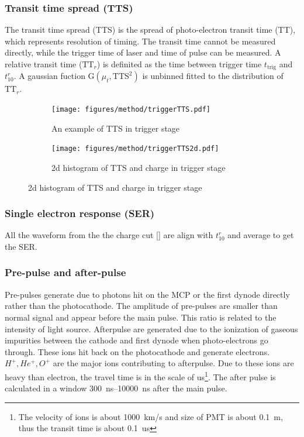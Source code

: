 \subsubsection{Transit time spread (TTS)}
The transit time spread (TTS) is the spread of photo-electron transit time (TT), which represents resolution of timing. The transit time cannot be measured directly, while the trigger time of laser and time of pulse can be measured. A relative transit time ($\mathrm{TT}_r$) is definited as the time between trigger time $t_{\mathrm{trig}}$ and $t_{10}^r$. A gaussian fuction G$(\mu_t,\mathrm{TTS}^2)$ is unbinned fitted to the distribution of $\mathrm{TT}_r$.
\begin{figure}[!htbp]
    \centering
    \begin{subfigure}[t]{0.47\textwidth}
        \texttt{[image: figures/method/triggerTTS.pdf]}
        \caption{An example of TTS in trigger stage}
        \label{fig:triggerTTS}
    \end{subfigure}
    \begin{subfigure}[t]{0.47\textwidth}
        \texttt{[image: figures/method/triggerTTS2d.pdf]}
        \caption{2d histogram of TTS and charge in trigger stage}
        \label{fig:triggerTTS2d}
    \end{subfigure}
\end{figure}
\subsubsection{Single electron response (SER)}
All the waveform from the the charge cut [] are align with $t_{10}^r$ and average to get the SER.
\subsubsection{Pre-pulse and after-pulse}
Pre-pulses generate due to photons hit on the MCP or the first dynode directly rather than the photocathode\cite{JUNOMassTesting}. The amplitude of pre-pulses are smaller than normal signal and appear before the main pulse. This ratio is related to the intensity of light source.
Afterpulse are generated due to the ionization of gaseous impurities between the cathode and first dynode when photo-electrons go through\cite{Coates_1973}. These ions hit back on the photocathode and generate electrons. $H^+,He^+,O^+$ are the major ions contributing to afterpulse\cite{Coates_1973}. Due to these ions are heavy than electron, the travel time is in the scale of \si{us}\footnote{The velocity of ions is about \SI{1000}{km/s} and size of PMT is about \SI{0.1}{m}, thus the transit time is about \SI{0.1}{us}}. The after pulse is calculated in a window \SIrange{300}{10000}{ns} after the main pulse.


